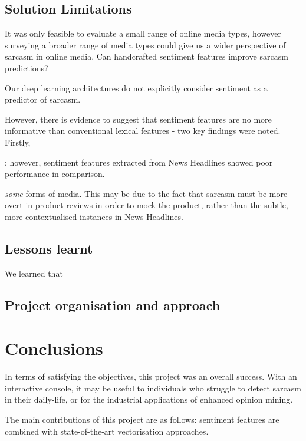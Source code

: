 \documentclass[12pt,a4paper]{article}
\begin{document}
\subsection{Solution Limitations}\vspace{-10pt}
It was only feasible to evaluate a small range of online media types, however surveying a broader range of media types could give us a wider perspective of sarcasm in online media.
Can handcrafted sentiment features improve sarcasm predictions?

Our deep learning architectures do not explicitly consider sentiment as a predictor of sarcasm.

However, there is evidence to suggest that sentiment features 
are no more informative than conventional lexical features - two key findings were noted. Firstly,  

; however, sentiment features extracted from News Headlines showed poor performance in comparison. 

\textit{some} forms of media. This may be due to the fact that sarcasm must be more overt in product reviews in order to mock the product, rather than the subtle, more contextualised instances in News Headlines.


\subsection{Lessons learnt}\vspace{-10pt}
We learned that 


\subsection{Project organisation and approach}\vspace{-10pt}





\section{Conclusions}
In terms of satisfying the objectives, this project was an overall success. With an interactive console, it may be useful to individuals who struggle to detect sarcasm in their daily-life, or for the industrial applications of enhanced opinion mining.

The main contributions of this project are as follows: sentiment features are combined with state-of-the-art vectorisation approaches. 
\end{document}
